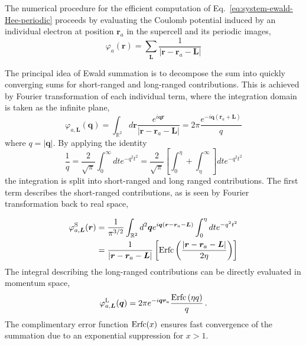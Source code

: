 \documentclass[
 reprint,
 amsmath,amssymb,
 aps, prx,
floatfix,longbibliography,
]{revtex4-2}
\begin{document}
\begin{appendix}
The numerical procedure for the efficient computation of Eq.~\eqref{eq:system-ewald-Hee-periodic} proceeds by evaluating the Coulomb potential induced by an individual electron at position $\bm{r}_{a}$ in the supercell and its periodic images,
\begin{equation}
    \varphi_{a}(\bm{r})=\sum_{\bm{L}}\frac{1}{|\bm{r}-\bm{r}_{a}-\bm{L}|}
\end{equation}

The principal idea of Ewald summation is to decompose the sum into quickly converging
sums for short-ranged and long-ranged contributions. This is achieved
by Fourier transformation of each individual term, where the integration
domain is taken as the infinite plane,
\begin{equation}
    \varphi_{a,\bm{L}}(\bm{q})=\int_{\mathbb{R}^2} d{\bm r}\frac{e^{i\bm{q}\bm{r}}}{|\bm{r}-\bm{r}_{a}-\bm{L}|}=2\pi\frac{e^{-i\bm{q}(\bm{r}_{a}+\bm{L})}}{q}
\end{equation}
where $q=|\bm{q}|$. By applying the identity
\begin{equation}
    \frac{1}{q}=\frac{2}{\sqrt{\pi}}\int_{0}^{\infty}dte^{-q^{2}t^{2}}=\frac{2}{\sqrt{\pi}}\left[\int_{0}^{\eta}+\int_{\eta}^{\infty}\right]dte^{-q^{2}t^{2}}
\end{equation}
the integration is split into short-ranged and long ranged contributions.
 The first term describes the short-ranged contributions, as is seen
by Fourier transformation back to real space,

\begin{align}
\varphi_{a,\bm{L}}^{{\rm S}}(\bm{r}) & =\frac{1}{\pi^{3/2}}\int_{\mathbb{R}^{2}}d^{2}\bm{q}e^{i\bm{q}(\bm{r}-\bm{r}_{a}-\bm{L})}\int_{0}^{\eta}dte^{-q^{2}t^{2}} \nonumber \\
 & =\frac{1}{|\bm{r}-\bm{r}_{a}-\bm{L}|}\left[{\rm Erfc}\left(\frac{|\bm{r}-\bm{r}_{a}-\bm{L}|}{2\eta}\right)\right]
\end{align}
The integral describing the long-ranged contributions can be directly
evaluated in momentum space,
\begin{equation}
    \varphi_{a,\bm{L}}^{{\rm L}}(\bm{q})=2\pi e^{-i\bm{q}\bm{r}_{a}}\frac{{\rm Erfc}\left(\eta q\right)}{q}\,.
\end{equation}
The complimentary error function ${\rm Erfc}(x)$ ensures fast convergence
of the summation due to an exponential suppression for $x>1$. 


\end{appendix}
\end{document}
